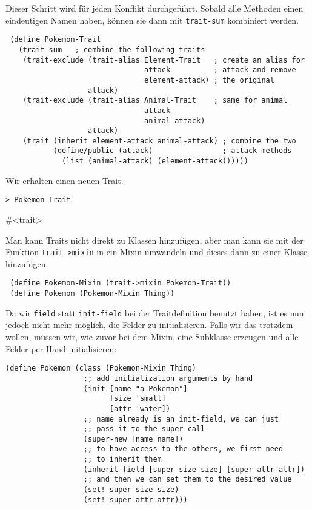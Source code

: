 Dieser Schritt wird für jeden Konflikt durchgeführt. Sobald alle Methoden einen eindeutigen Namen haben, können sie dann mit \texttt{trait-sum} kombiniert werden.

\begin{lstlisting}
 (define Pokemon-Trait
   (trait-sum   ; combine the following traits
    (trait-exclude (trait-alias Element-Trait   ; create an alias for
                                attack          ; attack and remove
                                element-attack) ; the original
                   attack)
    (trait-exclude (trait-alias Animal-Trait    ; same for animal
                                attack         
                                animal-attack)
                   attack)
    (trait (inherit element-attack animal-attack) ; combine the two
           (define/public (attack)                ; attack methods
             (list (animal-attack) (element-attack))))))
\end{lstlisting}

Wir erhalten einen neuen Trait. 

\begin{lstlisting}
> Pokemon-Trait
\end{lstlisting}
{\routput \#<trait>}

Man kann Traits nicht direkt zu Klassen hinzufügen, aber man kann sie mit der Funktion \texttt{trait->mixin} in ein Mixin umwandeln und dieses dann zu einer Klasse hinzufügen:

\begin{lstlisting}
 (define Pokemon-Mixin (trait->mixin Pokemon-Trait))
 (define Pokemon (Pokemon-Mixin Thing))
\end{lstlisting}

Da wir \texttt{field} statt \texttt{init-field} bei der Traitdefinition benutzt haben, ist es nun jedoch nicht mehr möglich, die Felder zu initialisieren. Falls wir das trotzdem wollen, müssen wir, wie zuvor bei dem Mixin, eine Subklasse erzeugen und alle Felder per Hand initialisieren:

\begin{lstlisting}
(define Pokemon (class (Pokemon-Mixin Thing)
                  ;; add initialization arguments by hand
                  (init [name "a Pokemon"]
                        [size 'small]
                        [attr 'water])
                  ;; name already is an init-field, we can just
                  ;; pass it to the super call
                  (super-new [name name])
                  ;; to have access to the others, we first need
                  ;; to inherit them
                  (inherit-field [super-size size] [super-attr attr])
                  ;; and then we can set them to the desired value
                  (set! super-size size)
                  (set! super-attr attr)))
\end{lstlisting}

